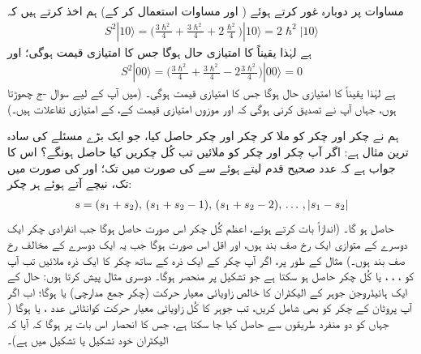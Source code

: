  مساوات  پر دوبارہ غور کرتے ہوئے ( اور مساوات  استعمال کر کے) ہم اخذ کرتے ہیں کہ 
\begin{align}\label{مساوات_تین_ابعاد_ایک_صفر_بعد_درکار}
S^2 | 1 0 \rangle = \big ( \frac{3\hslash^2}{4} + \frac{3\hslash^2}{4} +2 \frac{ \hslash^2}{4} \big ) | 1 0 \rangle =2\hslash^2 |1 0\rangle
\end{align}
ہے لہٰذا  یقیناً  کا امتیازی حال ہوگا جس کا امتیازی قیمت  ہوگی؛ اور 
\begin{align}
S^2 | 0 0 \rangle = \big ( \frac{3\hslash^2}{4} + \frac{3\hslash^2}{4} -2 \frac{3 \hslash^2}{4} \big ) | 0 0 \rangle =0
\end{align}
ہے لہٰذا  یقیناً  کا امتیازی حال ہوگا جس کا امتیازی قیمت  ہوگی۔ (میں آپ کے لیے سوال -ج چھوڑتا ہوں، جہاں آپ نے تصدیق کرنی ہوگی کہ  اور موزوں امتیازی قیمت کے،  کے امتیازی تفاعلات ہیں۔)

 ہم نے  چکر اور  چکر کو ملا کر  چکر اور  چکر حاصل کیا، جو ایک بڑے مسئلے کی سادہ ترین مثال ہے: اگر آپ  چکر اور  چکر کو ملائیں تب کُل چکریں  کیا حاصل ہونگے؟  اس کا جواب ہے کہ عدد صحیح قدم لیتے ہوئے  سے  کی صورت میں  تک؛ اور  کی صورت میں  تک، نیچے آتے ہوئے ہر چکر: 
\begin{align}
s=(s_1+s_2), \,(s_1+s_2-1),\, (s_1+s_2-2), \,\dotsc \, , \,\abs{s_1-s_2}
\end{align}
حاصل ہو گا۔ (اندازاً بات کرتے ہوئے، اعظم کُل چکر اس صورت حاصل ہوگا جب انفرادی چکر ایک دوسرے کے متوازی ایک رخ صف بند ہوں، اور اقل اس صورت ہوگا جب یہ ایک دوسرے کے مخالف رخ صف بند ہوں۔) مثال کے طور پر، اگر آپ  چکر کے ایک ذرہ کے ساتھ  چکر کا ایک ذرہ ملائیں تب آپ کو ، ، ، یا  کُل چکر حاصل ہو سکتا ہے جو تشکیل پر منحصر ہوگا۔ دوسری مثال پیش کرتا ہوں: حال  کے ایک ہائیڈروجن جوہر کے الیکٹران کا خالص زاویائی معیار حرکت (چکر
 جمع مدارچی)  یا  ہوگا؛ اب اگر آپ پروٹان کے چکر کو بھی شامل کریں، تب جوہر کا کُل زاویائی معیار حرکت کوانٹائی عدد ،  یا  ہوگا ( جہاں  کو دو منفرد طریقوں سے حاصل کیا جا سکتا ہے، جس کا انحصار اس بات پر ہوگا کہ آیا کہ الیکٹران خود  تشکیل یا  تشکیل میں ہے)۔

